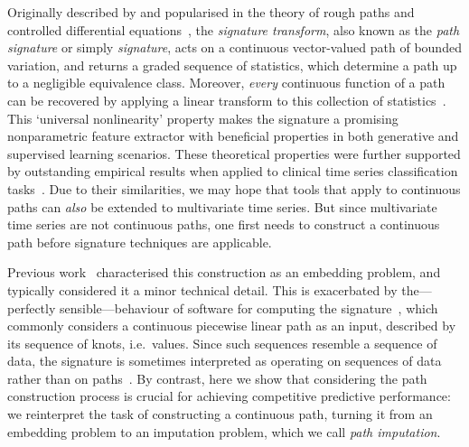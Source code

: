 \documentclass{article}
\begin{document}
Originally described by \citet{Chen54, Chen57, Chen58} and popularised
in the theory of rough paths and controlled differential
equations~\cite{lyons1998differential, FritzVictoir10, lyons2014rough},
the \emph{signature transform}, also known as the \emph{path signature}
or simply \emph{signature}, acts on a continuous vector-valued path of
bounded variation, and returns a graded sequence of statistics, which
determine a path up to a negligible equivalence class. Moreover,
\emph{every} continuous function of a path can be recovered by applying
a linear transform to this collection of statistics~\citep[Proposition
A.6]{kidger2019deep}.
%
This `universal nonlinearity' property makes the signature a promising nonparametric
feature extractor with beneficial properties in both generative and
supervised learning scenarios.
%
These theoretical properties were further supported by outstanding empirical
results when applied to clinical time series classification tasks~\citep{reyna2019early, morrill2019signature}.
Due to their similarities, we may hope that tools that
apply to continuous paths can \emph{also} be extended to multivariate
time series. But since multivariate time series are not continuous
paths, one first needs to construct a continuous path before signature techniques are applicable.

Previous work~\citep{levin2013, kidger2019deep, fermanian2019embedding}
characterised this construction as an embedding problem, and
typically considered it a minor technical detail.
This is exacerbated by the---perfectly sensible---behaviour of software
for computing the signature~\citep{iisignature, signatory}, which
commonly considers a continuous piecewise linear path as an input,
described by its sequence of knots, i.e.\ values.
%
Since such sequences resemble a sequence of data, the signature is
sometimes interpreted as operating on sequences of data rather than on
paths~\cite{kidger2019deep, levin2013}.
%
By contrast, here we show that considering the path construction
process is crucial for achieving competitive predictive
performance: we reinterpret the task of constructing a continuous path,
turning it from an embedding problem to an imputation problem, which we
call \emph{path imputation}.
%
\end{document}
